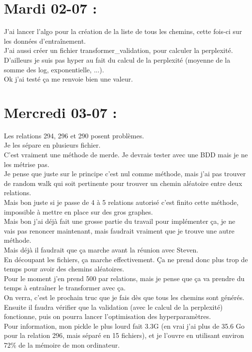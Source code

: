 \documentclass{article}
\begin{document}
\section*{Mardi 02-07 :}
J'ai lancer l'algo pour la création de la liste de tous les chemins, cette fois-ci sur les données d'entraînement.\\
J'ai aussi créer un fichier transformer\_validation, pour calculer la perplexité.\\
D'ailleurs je suis pas hyper au fait du calcul de la perplexité (moyenne de la somme des log, exponentielle, ...).\\
Ok j'ai testé ça me renvoie bien une valeur.\\
\section*{Mercredi 03-07 :}
Les relations 294, 296 et 290 posent problèmes.\\
Je les sépare en plusieurs fichier.\\
C'est vraiment une méthode de merde. Je devrais tester avec une BDD mais je ne les métrise pas.\\
Je pense que juste sur le principe c'est nul comme méthode, mais j'ai pas trouver de random walk qui soit pertinente pour trouver un chemin aléatoire entre deux relations.\\
Mais bon juste si je passe de 4 à 5 relations autorisé c'est finito cette méthode, impossible à mettre en place sur des gros graphes.\\
Mais bon j'ai déjà fait une grosse partie du travail pour implémenter ça, je ne vais pas renoncer maintenant, mais faudrait vraiment que je trouve une autre méthode.\\
Mais déjà il faudrait que ça marche avant la réunion avec Steven.\\
En découpant les fichiers, ça marche effectivement. Ça ne prend donc plus trop de temps pour avoir des chemins aléatoires.\\
Pour le moment j'en prend 500 par relations, mais je pense que ça va prendre du temps à entraîner le transformer avec ça.\\
On verra, c'est le prochain truc que je fais dès que tous les chemins sont générés.\\
Ensuite il faudra vérifier que la validation (avec le calcul de la perplexité) fonctionne, puis on pourra lancer l'optimisation des hyperparamètres.\\
Pour information, mon pickle le plus lourd fait 3.3G (en vrai j'ai plus de 35.6 Go pour la relation 296, mais séparé en 15 fichiers), et je l'ouvre en utilisant environ 72\% de la mémoire de mon ordinateur.\\
\end{document}
